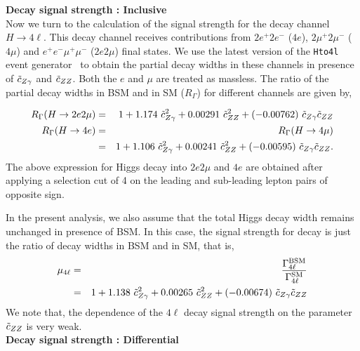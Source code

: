 {\bf Decay signal strength : Inclusive} \\


Now we turn to the calculation of the signal strength for the decay channel $H \to 4\ell$. This decay 
channel receives contributions from $2e^+2e^-$ ($4e$), $2\mu^+ 2\mu^-$ ($4\mu$) and $e^+e^-\mu^+\mu^-$ ($2e2\mu$) final states.
We use the latest version of the {\tt Hto4l} event generator~\cite{Boselli:2017pef} to obtain the partial decay widths in these 
channels in presence of $\tilde c_{Z\gamma}$ and $\tilde c_{ZZ}$. Both the $e$ and $\mu$ are treated as massless. The ratio of the partial decay widths in BSM and in SM ($R_\Gamma$) for different channels are given by, 

{
\begin{eqnarray}
 R_{\Gamma}(H \to 2e2\mu) &=& 1  + 1.174~ \tilde c_{Z\gamma}^2 + 0.00291~ \tilde c_{ZZ}^2  
   + (-0.00762)~\tilde c_{Z\gamma}\tilde c_{ZZ} \\
 R_{\Gamma}(H \to 4e) 
 &=& R_{\Gamma}(H \to 4\mu) \nonumber \\
 &=& 1  + 1.106~ \tilde c_{Z\gamma}^2 + 0.00241~ \tilde c_{ZZ}^2 
   + (-0.00595)~\tilde c_{Z\gamma}\tilde c_{ZZ}.
\end{eqnarray}
}
The above expression for Higgs decay
into $2e2\mu$ and $4e$ are obtained after applying a selection cut of { 4 \UGeV} on the leading and sub-leading lepton pairs
of opposite sign.

In the present analysis, we also assume that the total Higgs decay width remains unchanged in presence of BSM. In this
case, the signal strength for decay is just the ratio of decay widths in BSM and in SM, that is,
\begin{eqnarray}\label{eq:mu4l}
 \mu_{4\ell} &=& \frac{\Gamma^{\rm BSM}_{4\ell}}{\Gamma^{\rm SM}_{4\ell}}  \nonumber \\
 &=& 1  + 1.138~ \tilde c_{Z\gamma}^2 + 
 0.00265~ \tilde c_{ZZ}^2  +
 (-0.00674)~ \tilde c_{Z\gamma} \tilde c_{ZZ} 
\end{eqnarray}
We note that, the dependence of the $4\ell$ decay signal strength on the parameter $\tilde c_{ZZ}$ is very weak. \\

{\bf Decay signal strength : Differential} \\

